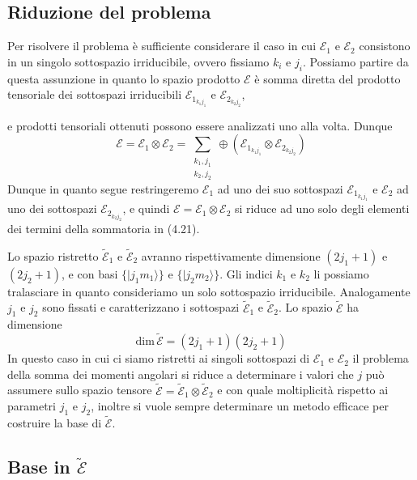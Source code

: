 \subsection{Riduzione del problema }

Per risolvere il problema \`e sufficiente considerare il caso in cui $\mathcal{E}_1$ e $\mathcal{E}_2$ consistono in un singolo sottospazio irriducibile, ovvero fissiamo $k_i$ e $j_i$. Possiamo partire da questa assunzione in quanto lo spazio prodotto $\mathcal{E}$ \`e somma diretta del prodotto tensoriale dei sottospazi irriducibili $\mathcal{E}_{1_{k_1j_1}}$ e  $\mathcal{E}_{2_{k_2j_2}}$, 
\newpage

e prodotti tensoriali ottenuti possono essere analizzati uno alla volta. Dunque
\begin{equation*}
	\mathcal{E} = \mathcal{E}_1 \otimes \mathcal{E}_2 = \sum_{\substack{k_1,j_1 \\[0.2cm] k_2,j_2}} \oplus (\mathcal{E}_{1_{k_1j_1}} \otimes \mathcal{E}_{2_{k_2j_2}})
\end{equation*}
Dunque in quanto segue restringeremo $\mathcal{E}_1$ ad uno dei suo sottospazi $\mathcal{E}_{1_{k_1j_1}}$ e $\mathcal{E}_2$ ad uno dei sottospazi $\mathcal{E}_{2_{k_2j_2}}$, e quindi $\mathcal{E} = \mathcal{E}_1 \otimes \mathcal{E}_2$ si riduce ad uno solo degli elementi dei termini della sommatoria in (4.21).

Lo spazio ristretto $\mathcal{\tilde{E}}_{1}$ e $\mathcal{\tilde{E}}_2$ avranno rispettivamente dimensione $(2j_1 +1)$ e $(2j_2+1)$, e con basi $\{|j_1m_1\rangle\}$ e $\{|j_2m_2 \rangle \}$. Gli indici $k_1$ e $k_2$ li possiamo tralasciare in quanto consideriamo un solo sottospazio irriducibile. Analogamente $j_1$ e $j_2$ sono fissati e caratterizzano i sottospazi $\mathcal{\tilde{E}}_1$ e $\mathcal{\tilde{E}}_2$. Lo spazio $\mathcal{\tilde{E}}$ ha dimensione 
\begin{equation*}
	\text{dim}\, \mathcal{\tilde{E}} = (2j_1+1)(2j_2+1)
\end{equation*}
In questo caso in cui ci siamo ristretti ai singoli sottospazi di $\mathcal{E}_1$ e $\mathcal{E}_2$ il problema della somma dei momenti angolari si riduce a determinare i valori che $j$ pu\`o assumere sullo spazio tensore $\mathcal{\tilde{E}} = \mathcal{\tilde{E}}_1 \otimes \mathcal{\tilde{E}}_2$ e con quale moltiplicit\`a rispetto ai parametri $j_1 $ e $j_2$, inoltre si vuole sempre determinare un metodo efficace per costruire la base di $\mathcal{\tilde{E}}$.

\subsection{Base in $\mathcal{\tilde{E}}$}

